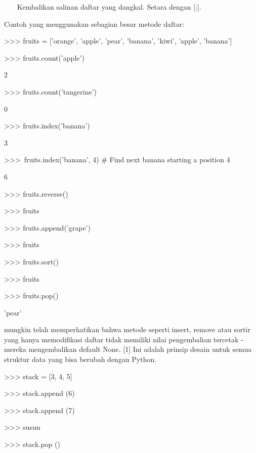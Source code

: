~~~ Kembalikan salinan daftar yang dangkal. Setara dengan [:]. \par
\vspace{12pt}
Contoh yang menggunakan sebagian besar metode daftar: \par
\vspace{12pt}
>>> fruits = ['orange', 'apple', 'pear', 'banana', 'kiwi', 'apple', 'banana'] \par
>>> fruits.count('apple') \par
2 \par
>>> fruits.count('tangerine') \par
0 \par
>>> fruits.index('banana') \par
3 \par
>>>~fruits.index('banana', 4)     \#   Find next banana starting a position 4 \par
6 \par
>>> fruits.reverse() \par
>>> fruits \par
['banana', 'apple', 'kiwi', 'banana', 'pear', 'apple', 'orange'] \par
>>> fruits.append('grape') \par
>>> fruits \par
['banana', 'apple', 'kiwi', 'banana', 'pear', 'apple', 'orange', 'grape'] \par
>>> fruits.sort() \par
>>> fruits \par
['apple', 'apple', 'banana', 'banana', 'grape', 'kiwi', 'orange', 'pear'] \par
>>> fruits.pop() \par
'pear' \par
\vspace{12pt}
mungkin telah memperhatikan bahwa metode seperti insert, remove atau sortir yang hanya memodifikasi daftar tidak memiliki nilai pengembalian tercetak - mereka mengembalikan default None. [1] Ini adalah prinsip desain untuk semua struktur data yang bisa berubah dengan Python. \par
\vspace{12pt}
>>> stack = [3, 4, 5] \par
>>> stack.append (6) \par
>>> stack.append (7) \par
>>> susun \par
[3, 4, 5, 6, 7] \par
>>> stack.pop () \par
